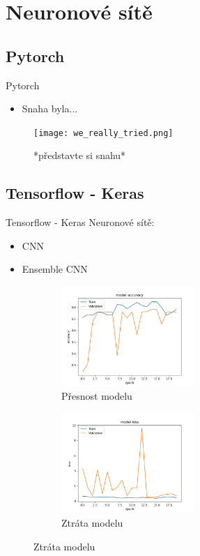 \documentclass[aspectratio=169]{beamer}
\begin{document}
\section{Neuronové sítě}

\subsection{Pytorch}

\begin{frame}{Pytorch}
    \begin{itemize}
        \item Snaha byla...
    \end{itemize}
    \begin{figure}
        \centering
        \texttt{[image: we\_really\_tried.png]}
        \caption{*představte si snahu*}
    \end{figure}
\end{frame}
\subsection{Tensorflow - Keras}

\begin{frame}{Tensorflow - Keras}
    Neuronové sítě:
    \begin{itemize}
        \item CNN
        \item Ensemble CNN
    \end{itemize}
    \begin{figure}
        \centering
        \begin{subfigure}{.5\textwidth}
            \centering
            \includegraphics[height=3.8cm]{accuracy_b_size8.png}
            \caption{Přesnost modelu}
            \label{fig:sub1}
        \end{subfigure}%
        \begin{subfigure}{.5\textwidth}
            \centering
            \includegraphics[height=3.8cm]{loss_b_size8.png}
            \caption{Ztráta modelu}
            \label{fig:sub2}
        \end{subfigure}
    \end{figure}
\end{frame}
\end{document}
